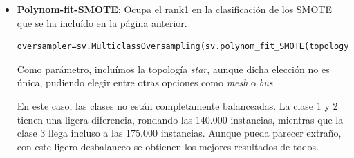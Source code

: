 \begin{itemize}
\begin{itemize}
		
		\item \textbf{Polynom-fit-SMOTE}: Ocupa el rank1 en la clasificación de los SMOTE que se ha incluído en la página anterior. 

		\begin{lstlisting}[frame=single]
oversampler=sv.MulticlassOversampling(sv.polynom_fit_SMOTE(topology='star')
		\end{lstlisting}
		Como parámetro, incluímos la topología \textit{star}, aunque dicha elección no es única, pudiendo elegir entre otras opciones como \textit{mesh} o \textit{bus}
	
	
	\begin{figure}[H]
		\centering
		
	\end{figure}

		En este caso, las clases no están completamente balanceadas. La clase 1 y 2 tienen una ligera diferencia, rondando las 140.000 instancias,  mientras que la clase 3 llega incluso a las 175.000 instancias. Aunque pueda parecer extraño, con este ligero desbalanceo se obtienen los mejores resultados de todos.
		
		
		
	
	\end{itemize}
	

	
	
\end{itemize}




